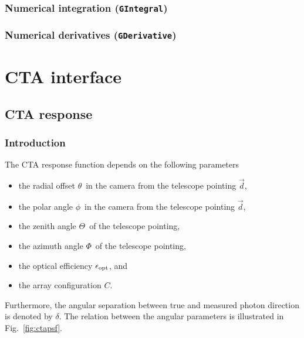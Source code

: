 \documentclass{article}[12pt,a4]
\begin{document}
\subsubsection{Numerical integration ({\tt GIntegral})}
\label{sec:integration}

\subsubsection{Numerical derivatives ({\tt GDerivative})}
\label{sec:integration}


\newpage
\section{CTA interface}
\newcommand{\teldir}{\mbox{$\vec{d}$}}
\newcommand{\srcdir}{\mbox{$\vec{p}$}}
\newcommand{\phdir}{\mbox{$\vec{p'}$}}
\newcommand{\mdir}{\mbox{$\vec{m}$}}
\newcommand{\off}{\mbox{$\theta$}}
\newcommand{\polar}{\mbox{$\phi$}}
\newcommand{\zen}{\mbox{$\Theta$}}
\newcommand{\azm}{\mbox{$\Phi$}}
\newcommand{\opt}{\mbox{$\epsilon_{\rm opt}$}}
\newcommand{\conf}{\mbox{$C$}}
\newcommand{\psfsep}{\mbox{$\delta$}}

\subsection{CTA response}

\subsubsection{Introduction}

The CTA response function depends on the following parameters
\begin{itemize}
\item the radial offset \off\ in the camera from the telescope pointing \teldir,
\item the polar angle \polar\ in the camera from the telescope pointing \teldir,
\item the zenith angle \zen\ of the telescope pointing,
\item the azimuth angle \azm\ of the telescope pointing,
\item the optical efficiency \opt, and
\item the array configuration \conf.
\end{itemize}
Furthermore, the angular separation between true and measured photon direction is
denoted by \psfsep.
The relation between the angular parameters is illustrated in Fig.~\ref{fig:ctapsf}.
\end{document}
